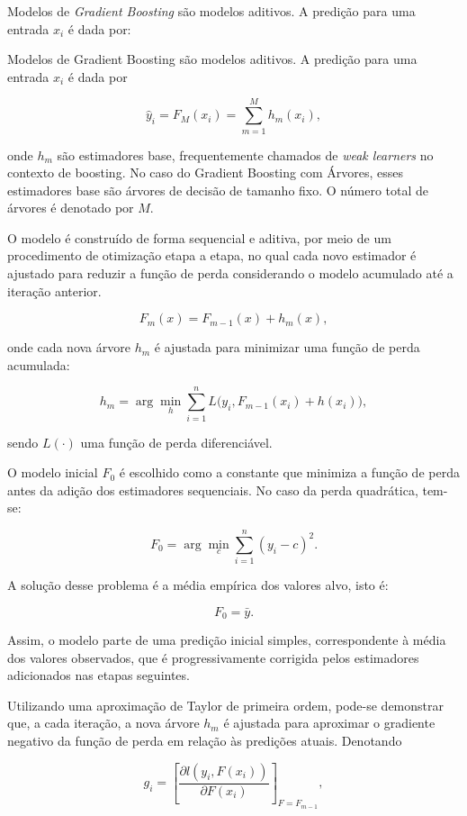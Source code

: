 Modelos de \textit{Gradient Boosting} são modelos aditivos. A predição para uma entrada \(x_i\) é dada por:

Modelos de Gradient Boosting são modelos aditivos. A predição para uma entrada \( x_i \) é dada por

\[
\hat{y}_i = F_M(x_i) = \sum_{m=1}^{M} h_m(x_i),
\]

onde \( h_m \) são estimadores base, frequentemente chamados de \textit{weak learners} no contexto de boosting. No caso do Gradient Boosting com Árvores, esses estimadores base são árvores de decisão de tamanho fixo. O número total de árvores é denotado por \( M \).

O modelo é construído de forma sequencial e aditiva, por meio de um procedimento de otimização etapa a etapa, no qual cada novo estimador é ajustado para reduzir a função de perda considerando o modelo acumulado até a iteração anterior.

\[
F_m(x) = F_{m-1}(x) + h_m(x),
\]

onde cada nova árvore \( h_m \) é ajustada para minimizar uma função de perda acumulada:

\[
h_m = \arg\min_{h} \sum_{i=1}^{n} L\big(y_i, F_{m-1}(x_i) + h(x_i)\big),
\]

sendo  \(L(\cdot)\) uma função de perda diferenciável.

O modelo inicial \(F_0\) é escolhido como a constante que minimiza a função de perda antes da adição dos estimadores sequenciais. No caso da perda quadrática, tem-se:

\begin{equation}
F_0 = \arg\min_c \sum_{i=1}^{n} (y_i - c)^2.
\end{equation}

\noindent A solução desse problema é a média empírica dos valores alvo, isto é:

\begin{equation}
F_0 = \bar{y}.
\end{equation}

\noindent Assim, o modelo parte de uma predição inicial simples, correspondente à média dos valores observados, que é progressivamente corrigida pelos estimadores adicionados nas etapas seguintes.

Utilizando uma aproximação de Taylor de primeira ordem, pode-se demonstrar que, a cada iteração, a nova árvore \( h_m \) é ajustada para aproximar o gradiente negativo da função de perda em relação às predições atuais. Denotando

\[
g_i = \left[ \frac{\partial l(y_i, F(x_i))}{\partial F(x_i)} \right]_{F = F_{m-1}},
\]

